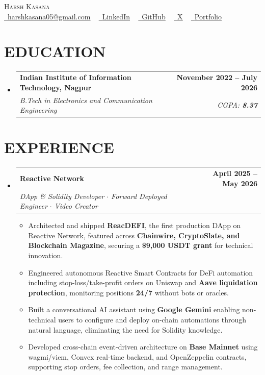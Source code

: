 \documentclass[letterpaper,10pt]{article}
\makeatletter
\newcommand{\resumeItem}[1]{
  \item\small{
    {#1 \vspace{-2pt}}
  }
}
\newcommand{\resumeSubheading}[4]{
  \vspace{-2pt}\item
    \begin{tabular*}{1.0\textwidth}[t]{l@{\extracolsep{\fill}}r}
      \textbf{#1} & \textbf{#2} \\
      \textit{#3} & \textit{#4} \\
    \end{tabular*}\vspace{-6pt}
}
\newcommand{\resumeSubHeadingListStart}{\begin{itemize}[leftmargin=0.0in, label={}]}
\newcommand{\resumeSubHeadingListEnd}{\end{itemize}}
\newcommand{\resumeItemListStart}{\begin{itemize}}
\newcommand{\resumeItemListEnd}{\end{itemize}\vspace{-4pt}}
\makeatother
\begin{document}
\begin{center}
    {\Huge \scshape Harsh Kasana} \\ \vspace{4pt}
    \small
    \href{mailto:harshkasana05@gmail.com}{\raisebox{-0.2\height}\faEnvelope\ \underline{harshkasana05@gmail.com}} ~
    \href{https://www.linkedin.com/in/harsh-kasana-8b6a79258/}{\raisebox{-0.2\height}\faLinkedin\ \underline{LinkedIn}} ~
    \href{https://github.com/harshkas4na}{\raisebox{-0.2\height}\faGithub\ \underline{GitHub}} ~
    \href{https://x.com/0xkasana}{\raisebox{-0.2\height}\faTwitter\ \underline{X}} ~
    \href{https://harshkasana.dev/}{\raisebox{-0.2\height}\faGlobe\ \underline{Portfolio}}
\end{center}


\section{EDUCATION}
  \resumeSubHeadingListStart
    \resumeSubheading
      {\textbf{Indian Institute of Information Technology, Nagpur}}{November 2022 -- July 2026}
      {\textit{B.Tech in Electronics and Communication Engineering}}{CGPA: \textbf{8.37}}
  \resumeSubHeadingListEnd

\section{EXPERIENCE}
  \resumeSubHeadingListStart
    \resumeSubheading
      {\textbf{Reactive Network}}{April 2025 -- May 2026}
      {\textit{DApp \& Solidity Developer $\cdot$ Forward Deployed Engineer $\cdot$ Video Creator}}{}
      \resumeItemListStart
        \resumeItem{Architected and shipped \textbf{ReacDEFI}, the first production DApp on Reactive Network, featured across \textbf{Chainwire, CryptoSlate, and Blockchain Magazine}, securing a \textbf{\$9,000 USDT grant} for technical innovation.}
        \resumeItem{Engineered autonomous Reactive Smart Contracts for DeFi automation including stop-loss/take-profit orders on Uniswap and \textbf{Aave liquidation protection}, monitoring positions \textbf{24/7} without bots or oracles.}
        \resumeItem{Built a conversational AI assistant using \textbf{Google Gemini} enabling non-technical users to configure and deploy on-chain automations through natural language, eliminating the need for Solidity knowledge.}
        \resumeItem{Developed cross-chain event-driven architecture on \textbf{Base Mainnet} using wagmi/viem, Convex real-time backend, and OpenZeppelin contracts, supporting stop orders, fee collection, and range management.}
      \resumeItemListEnd
  \resumeSubHeadingListEnd
\end{document}
